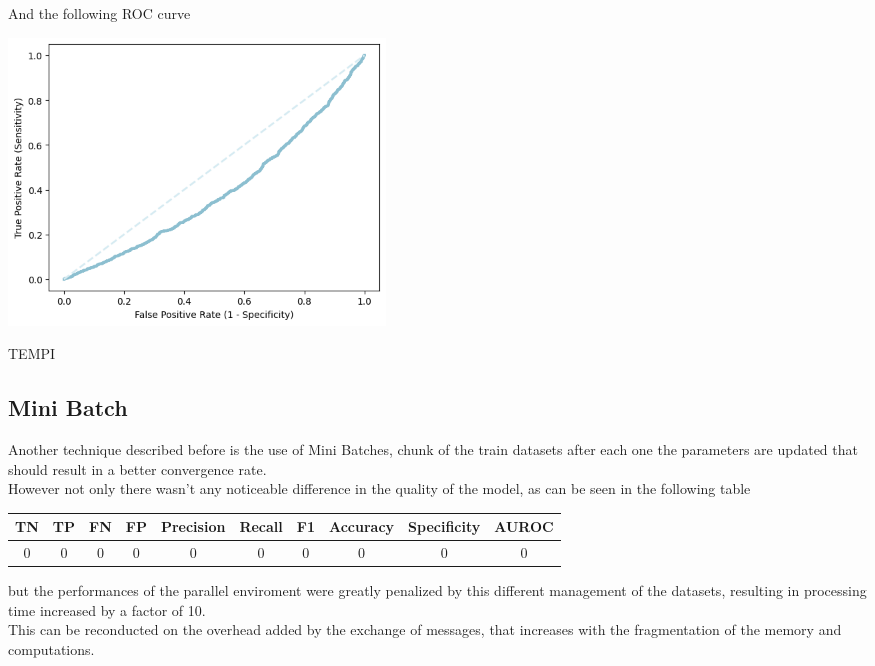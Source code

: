 \documentclass[
	letterpaper, %
	10pt, %
]{class}
\begin{document}
And the following ROC curve

\begin{center}
    \includegraphics[width=10cm]{../images/parallel_roc.png}
\end{center}

TEMPI

\subsection{Mini Batch}

Another technique described before is the use of Mini Batches, chunk of the train datasets after each one the parameters are updated that should result in a better convergence rate.\\
However not only there wasn't any noticeable difference in the quality of the model, as can be seen in the following table

\begin{center}
    \begin{tabular}{ |c|c|c|c|c|c|c|c|c|c| }
        \hline
        TN & TP & FN & FP & Precision & Recall & F1 & Accuracy & Specificity & AUROC \\
        \hline
        0  & 0  & 0  & 0  & 0         & 0      & 0  & 0        & 0           & 0     \\
        \hline
    \end{tabular}
\end{center}

but the performances of the parallel enviroment were greatly penalized by this different management of the datasets, resulting in processing time increased by a factor of 10.\\
This can be reconducted on the overhead added by the exchange of messages, that increases with the fragmentation of the memory and computations.
\end{document}
